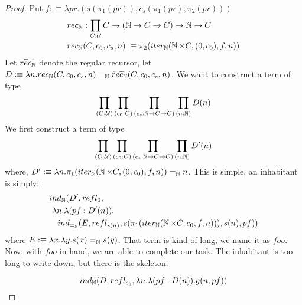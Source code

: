 \documentclass{article}
\begin{document}
\begin{proof}
  Put $f :\equiv \lambda pr. (s(\pi_1(pr)), c_s(\pi_1(pr), \pi_2(pr)))$
  \begin{align*}
    & rec_{\operatorname{\mathbb{N}}} : \prod_{C : \mathcal{U}} C \to (\operatorname{\mathbb{N}} \to C \to C) \to \operatorname{\mathbb{N}} \to C\\
    & rec_{\operatorname{\mathbb{N}}}(C, c_0, c_s, n) :\equiv \pi_2(iter_{\operatorname{\mathbb{N}}}(\operatorname{\mathbb{N}} \times C, (0, c_0), f,n))
  \end{align*}
  Let $\widetilde{rec_{\operatorname{\mathbb{N}}}}$ denote the regular recursor, let $D :\equiv \lambda
  n. rec_{\operatorname{\mathbb{N}}}(C, c_0, c_s, n) =_{\operatorname{\mathbb{N}}} \widetilde{rec_{\operatorname{\mathbb{N}}}}(C, c_0, c_s, n)$. We
  want to construct a term of type
  \[
    \prod_{(C : \mathcal{U})} \prod_{(c_0 : C)} \prod_{(c_s : \operatorname{\mathbb{N}} \to C \to C)}
    \prod_{(n : \operatorname{\mathbb{N}})} D(n)
  \]
  We first construct a term of type
  \[
    \prod_{(C : \mathcal{U})} \prod_{(c_0 : C)} \prod_{(c_s : \operatorname{\mathbb{N}} \to C \to C)}
    \prod_{(n : \operatorname{\mathbb{N}})} D'(n)
  \]
  where, $D' :\equiv \lambda n . \pi_1(iter_{\operatorname{\mathbb{N}}}(\operatorname{\mathbb{N}} \times C, (0, c_0), f, n)) =_{\operatorname{\mathbb{N}}}
  n$. This is simple, an inhabitant is simply:
  \begin{align*}
    & ind_{\operatorname{\mathbb{N}}}(D', refl_{0},\\
    & \ \lambda n . \lambda (pf : D'(n)) .\\
    & \quad ind_{=_{\operatorname{\mathbb{N}}}}(E, refl_{s(n)}, s(\pi_1(iter_{\operatorname{\mathbb{N}}}(\operatorname{\mathbb{N}} \times C,
    c_0, f, n))), s(n), pf))
  \end{align*}
  where $E :\equiv \lambda x . \lambda y . s(x) =_{\operatorname{\mathbb{N}}} s(y)$. That term is kind
  of long, we name it as $foo$. Now, with $foo$ in hand, we are able to
  complete our task. The inhabitant is too long to write down, but there is the
  skeleton:

  \[
    ind_{\operatorname{\mathbb{N}}}(D, refl_{c_0}, \lambda n . \lambda (pf : D(n)) . g(n,pf))
  \]


\end{proof}
\end{document}
